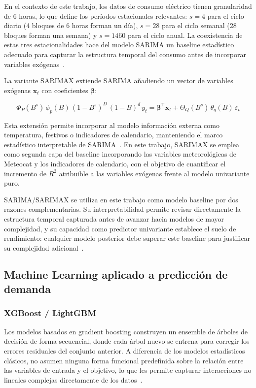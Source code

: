 \documentclass[12pt, a4paper]{article}
\begin{document}
En el contexto de este trabajo, los datos de consumo eléctrico tienen granularidad de 6 horas, lo que define los períodos estacionales relevantes: $s = 4$ para el ciclo diario (4 bloques de 6 horas forman un día), $s = 28$ para el ciclo semanal (28 bloques forman una semana) y $s = 1460$ para el ciclo anual. La coexistencia de estas tres estacionalidades hace del modelo SARIMA un baseline estadístico adecuado para capturar la estructura temporal del consumo antes de incorporar variables exógenas~\cite{hyndman2021}.

La variante SARIMAX extiende SARIMA añadiendo un vector de variables exógenas $\mathbf{x}_t$ con coeficientes $\boldsymbol{\beta}$:

\begin{equation}
\Phi_P(B^s)\,\phi_p(B)\,(1-B^s)^D\,(1-B)^d\, y_t = \boldsymbol{\beta}^\top \mathbf{x}_t + \Theta_Q(B^s)\,\theta_q(B)\,\varepsilon_t
\end{equation}

Esta extensión permite incorporar al modelo información externa como temperatura, festivos o indicadores de calendario, manteniendo el marco estadístico interpretable de SARIMA~\cite{hyndman2021}. En este trabajo, SARIMAX se emplea como segunda capa del baseline incorporando las variables meteorológicas de Meteocat y los indicadores de calendario, con el objetivo de cuantificar el incremento de $R^2$ atribuible a las variables exógenas frente al modelo univariante puro.

SARIMA/SARIMAX se utiliza en este trabajo como modelo baseline por dos razones complementarias. Su interpretabilidad permite revisar directamente la estructura temporal capturada antes de avanzar hacia modelos de mayor complejidad, y su capacidad como predictor univariante establece el suelo de rendimiento: cualquier modelo posterior debe superar este baseline para justificar su complejidad adicional~\cite{hyndman2021, boxjenkins2015}.

\subsection{Machine Learning aplicado a predicción de demanda}

\subsubsection{XGBoost / LightGBM}

Los modelos basados en gradient boosting construyen un ensemble de árboles de decisión de forma secuencial, donde cada árbol nuevo se entrena para corregir los errores residuales del conjunto anterior. A diferencia de los modelos estadísticos clásicos, no asumen ninguna forma funcional predefinida sobre la relación entre las variables de entrada y el objetivo, lo que les permite capturar interacciones no lineales complejas directamente de los datos~\cite{chen2016, ke2017}.
\end{document}
